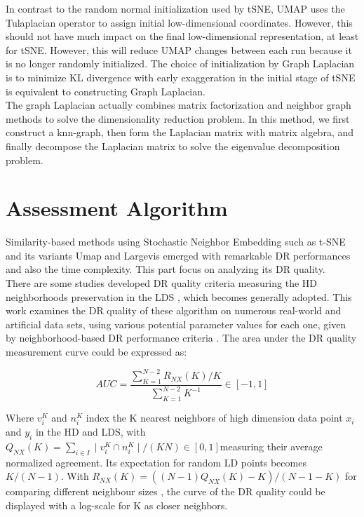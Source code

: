 \noindent In contrast to the random normal initialization used by tSNE, UMAP uses the Tulaplacian operator to assign initial low-dimensional coordinates. However, this should not have much impact on the final low-dimensional representation, at least for tSNE. However, this will reduce UMAP changes between each run because it is no longer randomly initialized. The choice of initialization by Graph Laplacian is to minimize KL divergence with early exaggeration in the initial stage of tSNE is equivalent to constructing Graph Laplacian.\\

\noindent The graph Laplacian actually combines matrix factorization and neighbor graph methods to solve the dimensionality reduction problem. In this method, we first construct a knn-graph, then form the Laplacian matrix with matrix algebra, and finally decompose the Laplacian matrix to solve the eigenvalue decomposition problem.\\

\chapter{Assessment Algorithm}

Similarity-based methods using Stochastic Neighbor Embedding such as t-SNE and its variants Umap and Largevis emerged with remarkable DR performances and also the time complexity. This part focus on analyzing its DR quality. \\

\noindent There are some studies developed DR quality criteria measuring the HD neighborhoods preservation in the LDS \cite{ref10}, which becomes generally adopted. This work examines the DR quality of these algorithm on numerous real-world and artificial data sets\cite{ref8}, using various potential parameter values for each one, given by neighborhood-based DR performance criteria \cite{ref9}. The area under the DR quality measurement curve could be expressed as:

\begin{equation*}
    AUC  = \frac{ \sum_{K=1}^{N-2} R_{NX}(K)/K}{\sum_{K=1}^{N-2}K^{-1}}   \in [-1,1]
\end{equation*}

\noindent Where $v^K_i$ and $n^K_i$ index the K nearest neighbors of high dimension data point $x_i$ and $y_i$ in the HD and LDS, with $Q_{NX} (K) = \sum_{i \in I} \mid v^K_i \cap n^K_i \mid / (KN) \in [0, 1] $measuring their average normalized agreement\cite{ref8}. Its expectation for random LD points becomes $K/ (N − 1)$. With $R_{NX} (K) = ((N − 1)Q_{NX} (K) − K) /(N − 1 − K)$ for comparing different neighbour sizes \cite{ref11}, the curve of the DR quality could be displayed with a log-scale for K as closer neighbors. \\ 